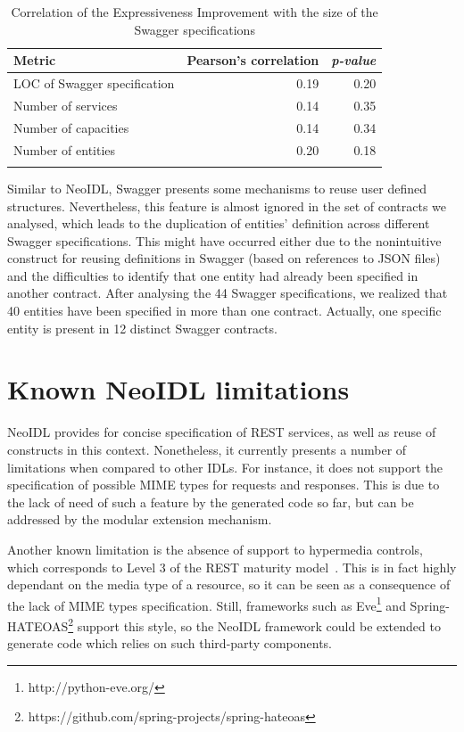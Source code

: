 \documentclass{ws-ijseke}
\newcommand{\neoidl}{NeoIDL}
\begin{document}
\begin{table}[htb]
\caption{Correlation of the Expressiveness Improvement with the size of the Swagger specifications}
\begin{center}
\begin{tabular}{lrr}
\toprule
Metric & Pearson's correlation & \emph{p-value} \\ \hline \hline 
LOC of Swagger specification & 0.19 &  0.20 \\ 
Number of services & 0.14 & 0.35 \\ 
Number of capacities & 0.14 & 0.34 \\
Number of entities & 0.20 & 0.18 \\ \botrule 
\end{tabular} 
\end{center}
\label{tab:size-corr}
\end{table}

Similar to \neoidl{}, Swagger presents 
some mechanisms to reuse user defined structures. Nevertheless, 
this feature is almost ignored in the set of contracts we analysed, which 
leads to the duplication of entities' definition across different 
Swagger specifications. This might have occurred either due to the 
nonintuitive construct for reusing definitions in Swagger (based on 
references to JSON files) and the difficulties to identify 
that one entity had already been specified in another contract.
After analysing the 44 Swagger specifications, we realized that 40 entities 
have been specified in  more than one contract. Actually, one specific 
entity is present in 12 distinct Swagger contracts. 

\section{Known \neoidl{} limitations}\label{sec:limitations}

\neoidl{} provides for concise specification of REST services, as well as
reuse of constructs in this context. Nonetheless, it currently presents a
number of limitations when compared to other IDLs.
For instance, it does not support the specification of possible MIME types
for requests and responses. This is due to the lack of need of such a feature
by the generated code so far, but can be addressed by the modular extension
mechanism.

Another known limitation is the absence of support 
to hypermedia controls, which
corresponds to Level 3 of the REST maturity 
model~\cite{richardson2008maturity}.
This is in fact highly dependant on the media type of a resource, 
so it can be seen as a consequence of the lack of MIME 
types specification. Still, frameworks
such as Eve\footnote{http://python-eve.org/} and
Spring-HATEOAS\footnote{https://github.com/spring-projects/spring-hateoas} 
support this style, so the \neoidl{} framework could be 
extended to generate code which relies on such third-party components.
\end{document}
